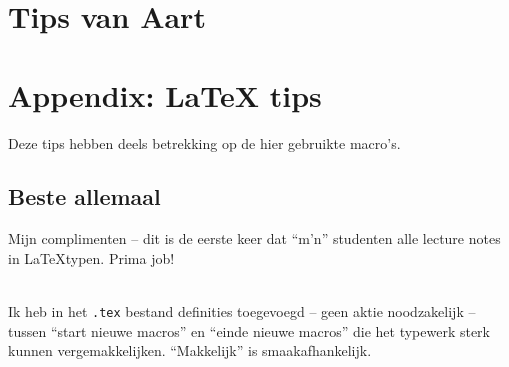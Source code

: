 \documentclass{2wa40summary}
\begin{document}
		\newpage
		\section{Tips van Aart}			
%		
		
		
		
		
		\newpage
		
		\appendix
		\section{Appendix: LaTeX tips}
		
		\opm Deze tips hebben deels betrekking op de hier gebruikte macro's.
		
		\subsection{Beste allemaal}
		
		Mijn complimenten -- dit is de eerste keer dat ``m'n'' studenten alle lecture notes in \LaTeX typen.
		Prima job!
		
		\ \\
		Ik heb in het \verb$.tex$ bestand definities toegevoegd -- geen aktie noodzakelijk -- tussen
		``start nieuwe macros'' en ``einde nieuwe macros'' die het
		typewerk sterk kunnen vergemakkelijken. ``Makkelijk'' is smaakafhankelijk.
		
\end{document}
